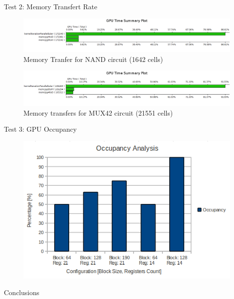 \documentclass[10pt, red]{beamer}
\begin{document}
	\begin{frame}{Test 2: Memory Transfert Rate}
	 	\begin{figure}
			\centering
			\includegraphics[width=\textwidth]{img/GPUTimeSummaryPlotNAND}
			\caption{Memory Tranfer for NAND circuit (1642 cells)}
	 	\end{figure} 
		\begin{figure}
			\centering
			\includegraphics[width=\textwidth]{img/GPUTimeSummaryPlotMUX42}
			\caption{Memory transfers for MUX42 circuit (21551 cells)}
		\end{figure}
	\end{frame}

	\begin{frame}{Test 3: GPU Occupancy}
	 	\begin{figure}
			\centering
			\includegraphics[width=\textwidth]{img/OccupancyAnalysis}
	 	\end{figure} 
	\end{frame}

	\begin{frame}{Conclusions}
	\end{frame}
\end{document}
